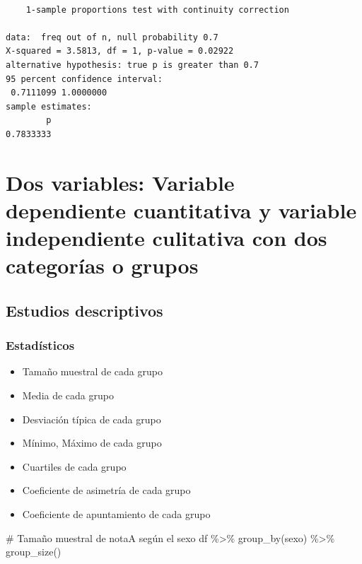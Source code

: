 \documentclass[
  a4paper,
]{scrreport}
\newenvironment{Shaded}{\begin{snugshade}}{\end{snugshade}}
\newcommand{\CommentTok}[1]{\textcolor[rgb]{0.37,0.37,0.37}{#1}}
\newcommand{\FunctionTok}[1]{\textcolor[rgb]{0.28,0.35,0.67}{#1}}
\newcommand{\NormalTok}[1]{\textcolor[rgb]{0.00,0.23,0.31}{#1}}
\newcommand{\SpecialCharTok}[1]{\textcolor[rgb]{0.37,0.37,0.37}{#1}}
\providecommand{\tightlist}{%
  \setlength{\itemsep}{0pt}\setlength{\parskip}{0pt}}\usepackage{longtable,booktabs,array}
\theoremstyle{definition}
\theoremstyle{definition}
\theoremstyle{remark}
\begin{document}
\begin{verbatim}

    1-sample proportions test with continuity correction

data:  freq out of n, null probability 0.7
X-squared = 3.5813, df = 1, p-value = 0.02922
alternative hypothesis: true p is greater than 0.7
95 percent confidence interval:
 0.7111099 1.0000000
sample estimates:
        p 
0.7833333 
\end{verbatim}

\hypertarget{dos-variables-variable-dependiente-cuantitativa-y-variable-independiente-culitativa-con-dos-categoruxedas-o-grupos}{%
\section{Dos variables: Variable dependiente cuantitativa y variable
independiente culitativa con dos categorías o
grupos}\label{dos-variables-variable-dependiente-cuantitativa-y-variable-independiente-culitativa-con-dos-categoruxedas-o-grupos}}

\hypertarget{estudios-descriptivos-2}{%
\subsection{Estudios descriptivos}\label{estudios-descriptivos-2}}

\hypertarget{estaduxedsticos-2}{%
\subsubsection{Estadísticos}\label{estaduxedsticos-2}}

\begin{itemize}
\tightlist
\item
  Tamaño muestral de cada grupo
\item
  Media de cada grupo
\item
  Desviación típica de cada grupo
\item
  Mínimo, Máximo de cada grupo
\item
  Cuartiles de cada grupo
\item
  Coeficiente de asimetría de cada grupo
\item
  Coeficiente de apuntamiento de cada grupo
\end{itemize}

\begin{Shaded}
\begin{Highlighting}[]
\CommentTok{\# Tamaño muestral de notaA según el sexo}
\NormalTok{df }\SpecialCharTok{\%\textgreater{}\%} \FunctionTok{group\_by}\NormalTok{(sexo) }\SpecialCharTok{\%\textgreater{}\%} \FunctionTok{group\_size}\NormalTok{()}
\end{Highlighting}
\end{Shaded}
\end{document}
